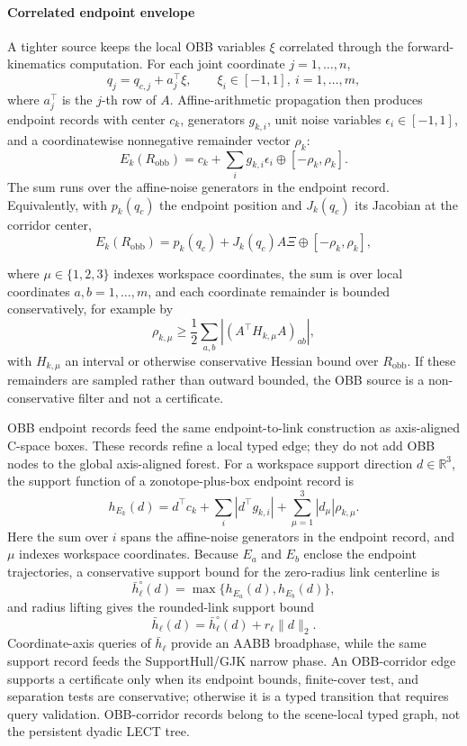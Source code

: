 \documentclass[journal]{IEEEtran}
\newcommand{\cspace}{\mbox{C-space}}
\begin{document}
\paragraph{Correlated endpoint envelope}
A tighter source keeps the local OBB variables \(\xi\) correlated through the
forward-kinematics computation. For each joint coordinate \(j=1,\ldots,n\),
\[
q_j=q_{c,j}+a_j^\top\xi,\qquad \xi_i\in[-1,1],\ i=1,\ldots,m,
\]
where \(a_j^\top\) is the \(j\)-th row of \(A\). Affine-arithmetic propagation
then produces endpoint records with center \(c_k\), generators \(g_{k,i}\), unit
noise variables \(\epsilon_i\in[-1,1]\), and a coordinatewise nonnegative
remainder vector \(\rho_k\):
\[
E_k(R_{\mathrm{obb}})
=
c_k+\sum_i g_{k,i}\epsilon_i \oplus [-\rho_k,\rho_k].
\]
The sum runs over the affine-noise generators in the endpoint record.
Equivalently, with \(p_k(q_c)\) the endpoint position and \(J_k(q_c)\) its
Jacobian at the corridor center,
\[
E_k(R_{\mathrm{obb}})
=
p_k(q_c)+J_k(q_c)A\Xi \oplus [-\rho_k,\rho_k],
\]
\begin{samepage}
where \(\mu\in\{1,2,3\}\) indexes workspace coordinates, the sum is over local
coordinates \(a,b=1,\ldots,m\), and each coordinate remainder is bounded
conservatively, for example by
\[
\rho_{k,\mu}\ge
\frac{1}{2}\sum_{a,b}
\left|{\left(A^\top H_{k,\mu}A\right)}_{ab}\right|,
\]
with \(H_{k,\mu}\) an interval or otherwise conservative Hessian bound over
\(R_{\mathrm{obb}}\). If these remainders are sampled rather than outward bounded,
the OBB source is a non-conservative filter and not a certificate.
\end{samepage}

OBB endpoint records feed the same endpoint-to-link construction as axis-aligned
\cspace{} boxes.
These records refine a local typed edge; they do not add OBB nodes to the global
axis-aligned forest.
For a workspace support direction \(d\in\mathbb{R}^3\), the support function of
a zonotope-plus-box endpoint record is
\[
h_{E_k}(d)=d^\top c_k+\sum_i |d^\top g_{k,i}|
          +\sum_{\mu=1}^3 |d_\mu|\rho_{k,\mu}.
\]
Here the sum over \(i\) spans the affine-noise generators in the
endpoint record, and \(\mu\) indexes workspace coordinates.
Because \(E_a\) and \(E_b\) enclose the endpoint trajectories, a conservative
support bound for the zero-radius link centerline is
\[
\bar h_\ell^\circ(d)=\max\{h_{E_a}(d),h_{E_b}(d)\},
\]
and radius lifting gives the rounded-link support bound
\[
\bar h_\ell(d)=\bar h_\ell^\circ(d)+r_\ell\|d\|_2.
\]
Coordinate-axis queries of \(\bar h_\ell\) provide an AABB broadphase, while the same
support record feeds the SupportHull/GJK narrow phase. An OBB-corridor edge
supports a certificate only when its endpoint bounds, finite-cover test, and
separation tests are conservative; otherwise it is a typed transition that
requires query validation. OBB-corridor records belong to the scene-local typed
graph, not the persistent dyadic LECT tree.
\end{document}
